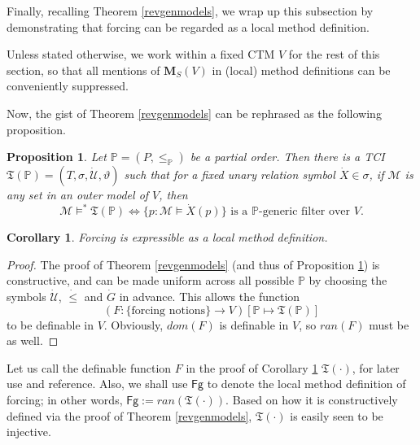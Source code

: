 \documentclass[12pt, twoside]{memoir}
\numberwithin{equation}{section}
\newtheorem{prop}[thm]{Proposition}
\newtheorem{cor}[thm]{Corollary}
\theoremstyle{definition}
\theoremstyle{remark}
\theoremstyle{definition}
\theoremstyle{definition}
\theoremstyle{definition}
\theoremstyle{remark}
\begin{document}
Finally, recalling Theorem \ref{revgenmodels}, we wrap up this subsection by demonstrating that forcing can be regarded as a local method definition.

Unless stated otherwise, we work within a fixed CTM $V$ for the rest of this section, so that all mentions of $\mathbf{M}_S(V)$ in (local) method definitions can be conveniently suppressed.

Now, the gist of Theorem \ref{revgenmodels} can be rephrased as the following proposition.

\begin{prop}\label{prop323}
Let $\mathbb{P} = (P, \leq_{\mathbb{P}})$ be a partial order. Then there is a TCI $\mathfrak{T}(\mathbb{P}) = (T, \sigma, \dot{\mathcal{U}}, \vartheta)$ such that for a fixed unary relation symbol $\dot{X} \in \sigma$, if $\mathcal{M}$ is any set in an outer model of $V$, then
\begin{equation*}
    \mathcal{M} \models^* \mathfrak{T}(\mathbb{P}) \iff \{p : \mathcal{M} \models \dot{X}(p)\} \text{ is a } \mathbb{P} \text{-generic filter over } V \text{.}
\end{equation*}
\end{prop}

\begin{cor}\label{cor324}
Forcing is expressible as a local method definition.
\end{cor}

\begin{proof}
The proof of Theorem \ref{revgenmodels} (and thus of Proposition \ref{prop323}) is constructive, and can be made uniform across all possible $\mathbb{P}$ by choosing the symbols $\dot{\mathcal{U}}$, $\dot{\leq}$ and $\dot{G}$ in advance. This allows the function 
\begin{equation*}
    (F : \{\text{forcing notions}\} \longrightarrow V) [\mathbb{P} \mapsto \mathfrak{T}(\mathbb{P})]
\end{equation*}
to be definable in $V$. Obviously, $dom(F)$ is definable in $V$, so $ran(F)$ must be as well. 
\end{proof}

Let us call the definable function $F$ in the proof of Corollary \ref{cor324} $\mathfrak{T}(\cdot)$, for later use and reference. Also, we shall use $\mathsf{Fg}$ to denote the local method definition of forcing; in other words,  $\mathsf{Fg} := ran(\mathfrak{T}(\cdot))$. Based on how it is constructively defined via the proof of Theorem \ref{revgenmodels}, $\mathfrak{T}(\cdot)$ is easily seen to be injective.
\end{document}
